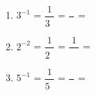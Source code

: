 \begin{enumerate}[label=\arabic*.]
    \begin{enumerate}[label=\alph*)]
        \item $3^{-1}$ = $\dfrac{1}{3^{\phantom{0}}}$ = $\dfrac{\phantom{0}}{\phantom{0}}$ = \underline{\hspace{3cm}}
        \vspace{0.5cm}

        \item $2^{-2}$ = $\dfrac{1}{2^{\phantom{0}}}$ = $\dfrac{1}{\phantom{00}}$ = \underline{\hspace{3cm}}
        \vspace{0.5cm}

        \item $5^{-1}$ = $\dfrac{1}{5^{\phantom{0}}}$ = $\dfrac{\phantom{0}}{\phantom{0}}$ = \underline{\hspace{3cm}}
    \end{enumerate}

\end{enumerate}
